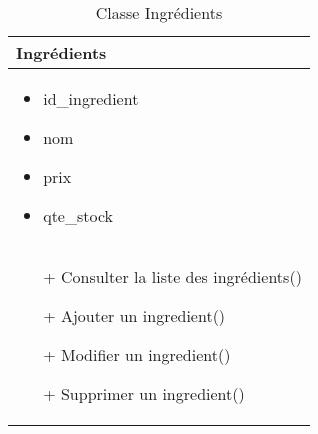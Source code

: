 \begin{table}[H]
    \begin{center}
        \begin{tabular}{|Z{5cm}|}
            \hline
            \textbf{Ingrédients}\\
            \hline
            \begin{itemize}
                \item id\_ingredient
                \item nom
                \item prix
                \item qte\_stock
            \end{itemize}\\
            \hline
            \begin{itemize}
                \item[+] Consulter la liste des ingrédients()
                \item[+] Ajouter un ingredient()
                \item[+] Modifier un ingredient()
                \item[+] Supprimer un ingredient()
            \end{itemize}
            \\
            \hline
        \end{tabular}	
        \caption{Classe Ingrédients}
    \end{center}
\end{table}

